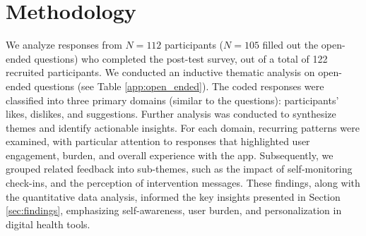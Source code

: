 \section{Methodology}
\label{sec:methodology}
We analyze responses from $N=112$ participants ($N=105$ filled out the open-ended questions) who completed the post-test survey, out of a total of 122 recruited participants. 
We conducted an inductive thematic analysis \cite{clarke2017thematic} on open-ended questions (see Table \ref{app:open_ended}). The coded responses were classified into three primary domains (similar to the questions): participants' likes, dislikes, and suggestions. Further analysis was conducted to synthesize themes and identify actionable insights. For each domain, recurring patterns were examined, with particular attention to responses that highlighted user engagement, burden, and overall experience with the app. Subsequently, we grouped related feedback into sub-themes, such as the impact of self-monitoring check-ins, and the perception of intervention messages. 
These findings, along with the quantitative data analysis, informed the key insights presented in Section \ref{sec:findings}, emphasizing self-awareness, user burden, and personalization in digital health tools.



